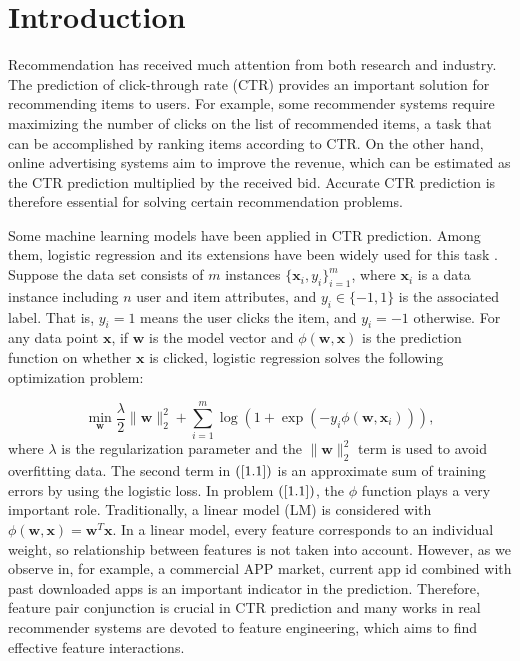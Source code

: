 \section{Introduction}

Recommendation has received much attention from both research and industry. The prediction of click-through rate (CTR) provides an important solution for recommending items to users. For example, some recommender systems require maximizing the number of clicks on the list of recommended items, a task that can be accomplished by ranking items according to CTR. On the other hand, online advertising systems aim to improve the revenue, which can be estimated as the CTR prediction multiplied by the received bid. Accurate CTR prediction is therefore essential for solving certain recommendation problems.

Some machine learning models have been applied in CTR prediction. Among them, logistic regression and its extensions have been widely used for this task \cite{Richardson:2007:PCE:1242572.1242643}. Suppose the data set consists of $m$ instances $\lbrace\boldsymbol{x}_i,y_i\rbrace_{i=1}^m$, where $\boldsymbol{x}_i$ is a data instance including $n$ user and item attributes, and $y_i\in\lbrace-1,1\rbrace$ is the associated label. That is, $y_i=1$ means the user clicks the item, and $y_i=-1$ otherwise. For any data point $\boldsymbol{x}$, if  $\boldsymbol{w}$ is the model vector and $\phi(\boldsymbol{w}, \boldsymbol{x})$ is the prediction function on whether $\boldsymbol{x}$ is clicked, logistic regression solves the following optimization problem:

\begin{equation}\label{1.1}
\min_{\boldsymbol{w}} \frac{\lambda}{2} \|\boldsymbol{w}\|_2^2+\sum_{i=1}^{m}\log(1+\exp(-y_i\phi(\boldsymbol{w},\boldsymbol{x}_i))),
\end{equation}
where $\lambda$ is the regularization parameter and the $\|\boldsymbol{w}\|_2^2$ term is used to avoid overfitting data. The second term in $(\ref{1.1})$ is an approximate sum of training errors by using the logistic loss.
In problem $(\ref{1.1})$, the $\phi$ function plays a very important role. Traditionally, a linear model (LM) is considered with $\phi(\boldsymbol{w}, \boldsymbol{x})=\boldsymbol{w}^{T}\boldsymbol{x}$. In a linear model, every feature corresponds to an individual weight, so relationship between features is not taken into account. However, as we observe in, for example, a commercial APP market, current app id combined with past downloaded apps is an important indicator in the prediction. Therefore, feature pair conjunction is crucial in CTR prediction and many works in real recommender systems are devoted to feature engineering, which aims to find effective feature interactions.

